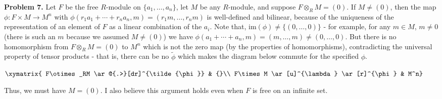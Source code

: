 \documentclass[11pt]{article}
\newcommand{\num}[1]{\noindent \textbf{#1}}
\theoremstyle{definition}
\begin{document}
\num{Problem 7.} Let $F$ be the free $R$-module on $\{a_1,\ldots,a_n\}$,
let $M$ be any $R$-module, and suppose $F\otimes_R M=(0)$. If
$M\neq(0)$, then the map $\phi:F\times M\rightarrow M^n$ with
$\phi(r_1a_1+\cdots+r_na_n,m)=(r_1m,\ldots,r_nm)$ is well-defined
and bilinear, because of the uniqueness of the representation of
an element of $F$ as a linear combination of the $a_i$. Note that,
im$(\phi)\neq\{(0,\ldots,0)\}$ - for example, for any $m\in M$,
$m\neq 0$ (there is such an $m$ because we assumed $M\neq(0)$) we have
$\phi(a_1+\cdots+a_n,m)=(m,\ldots,m)\neq(0,\ldots,0)$. But there is no
homomorphism from $F\otimes_RM=(0)$ to $M^n$ which is not the zero map (by
the properties of homomorphisms), contradicting the universal property of
tensor products - that is, there can be no $\tilde{\phi}$ which makes the
diagram below commute for the specified $\phi$.\\

\begin{center}
$\xymatrix{
F\otimes_RM \ar@{.>}[dr]^{\tilde{\phi}} & {}\\
F\times M \ar[u]^{\lambda} \ar[r]^{\phi} & M^n}$\\
\end{center}   

\noindent Thus, we must have $M=(0)$. I also believe this argument holds
even when $F$ is free on an infinite set.
\end{document}
